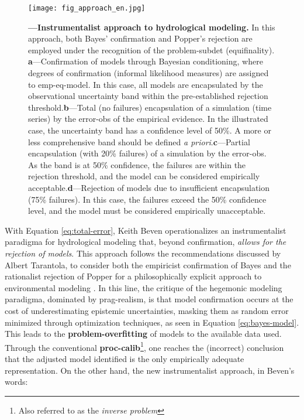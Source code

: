\documentclass[./main_en.tex]{subfiles}
\begin{document}
\begin{figure}[t!] %
	\centering				
	\texttt{[image: fig\_approach\_en.jpg]}		
	\caption[Instrumentalist approach to hydrological modeling]
	{\textbf{---\;Instrumentalist approach to hydrological modeling.}
        In this approach, both Bayes' confirmation and Popper's rejection are employed under the recognition of the \gls{problem-subdet} (equifinality). \;\textbf{a}\;---\;Confirmation of models through Bayesian \gls{conditioning}, where degrees of confirmation (informal \gls{likelihood} measures) are assigned to \gls{emp-eq-model}. In this case, all models are encapsulated by the observational uncertainty band within the pre-established rejection threshold.\;\textbf{b}\;---\;Total (no failures) encapsulation of a simulation (time series) by the \gls{error-obs} of the empirical evidence. In the illustrated case, the uncertainty band has a confidence level of 50\%. A more or less comprehensive band should be defined \textit{a priori}.\;\textbf{c}\;---\;Partial encapsulation (with 20\% failures) of a simulation by the \gls{error-obs}. As the band is at 50\% confidence, the failures are within the rejection threshold, and the \gls{model} can be considered empirically acceptable.\;\textbf{d}\;---\;Rejection of models due to insufficient encapsulation (75\% failures). In this case, the failures exceed the 50\% confidence level, and the \gls{model} must be considered empirically unacceptable.\;
	}
\label{fig:approach}  %
\end{figure}

\par With Equation \eqref{eq:total-error}, Keith Beven operationalizes an instrumentalist \gls{paradigma} for hydrological modeling that, beyond confirmation, \textit{allows for the rejection of models}. This approach follows the recommendations discussed by Albert Tarantola, to consider both the empiricist confirmation of Bayes and the rationalist rejection of Popper for a philosophically explicit approach to environmental modeling \cite{Tarantola2006}. In this line, the critique of the hegemonic modeling \gls{paradigma}, dominated by \gls{prag-realism}, is that model confirmation occurs at the cost of underestimating epistemic uncertainties, masking them as random error minimized through optimization techniques, as seen in Equation \eqref{eq:bayes-model}. This leads to the \textbf{\gls{problem-overfitting}} of models to the available data used. Through the conventional \textbf{\gls{proc-calib}}\footnote{Also referred to as the \textit{inverse problem}}, one reaches the (incorrect) conclusion that the adjusted \gls{model} identified is the only empirically adequate representation. On the other hand, the new instrumentalist approach, in Beven's words:
\end{document}
